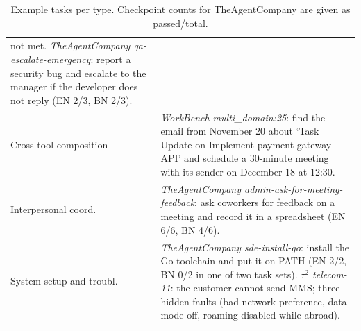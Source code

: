 \documentclass[11pt]{article}
\begin{document}
\begin{table}[t]
\begin{tabular}{L{2.8cm}L{12.0cm}}
not met. \textit{TheAgentCompany qa-escalate-emergency}: report a security bug and escalate
to the manager if the developer does not reply (EN 2/3, BN 2/3). \\
Cross-tool composition & \textit{WorkBench multi\_domain:25}: find the email from November 20
about `Task Update on Implement payment gateway API' and schedule a 30-minute meeting with its
sender on December 18 at 12:30. \\
Interpersonal coord. & \textit{TheAgentCompany admin-ask-for-meeting-feedback}: ask coworkers
for feedback on a meeting and record it in a spreadsheet (EN 6/6, BN 4/6). \\
System setup and troubl. & \textit{TheAgentCompany sde-install-go}: install the Go toolchain
and put it on PATH (EN 2/2, BN 0/2 in one of two task sets). \textit{$\tau^2$ telecom-11}: the
customer cannot send MMS; three hidden faults (bad network preference, data mode off, roaming
disabled while abroad). \\
\bottomrule
\end{tabular}
\caption{Example tasks per type. Checkpoint counts for TheAgentCompany are given as passed/total.}
\label{tab:taxexamples}
\end{table}
\end{document}
